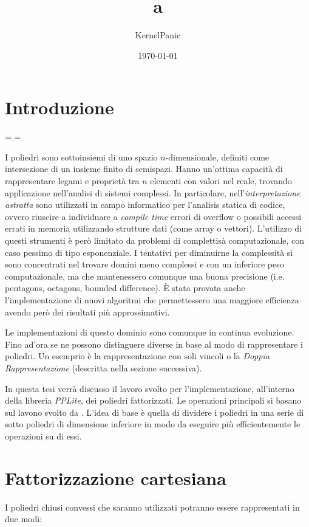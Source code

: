 \documentclass{mimosis}
\author{KernelPanic}
\date{\today}
\title{a}
\theoremstyle{definition}
\begin{document}
\maketitle
\tableofcontents


\chapter{Introduzione}
\label{sec:org8391ac6}

\newdimen\origiwspc%
  \newdimen\origiwstr%
  \origiwspc=\font%
  \origiwstr=\font%

I poliedri sono sottoinsiemi di uno spazio \(n\text{-dimensionale}\), definiti come
intersezione di un insieme finito di semispazi. Hanno un'ottima capacità di
rappresentare legami e proprietà tra \(n\) elementi con valori nel reale, trovando
applicazione nell'analisi di sistemi complessi. In particolare,
nell'\emph{interpretazione astratta} sono utilizzati in campo informatico per
l'analisis statica di codice, ovvero riuscire a individuare a \emph{compile time}
errori di overflow o possibili accessi errati in memoria utilizzando strutture
dati (come array o vettori). L'utilizzo di questi strumenti è però limitato da
problemi di complettisà computazionale, con caso pessimo di tipo esponenziale. I
tentativi per diminuirne la complessità si sono concentrati nel trovare domini
meno complessi e con un inferiore peso computazionale, ma che mantenessero
comunque una buona precisione (i.e. pentagons, octagons, bounded difference). È
stata provata anche l'implementazione di nuovi algoritmi che permettessero una
maggiore efficienza avendo però dei risultati più approssimativi.

Le implementazioni di questo dominio sono comunque in continua evoluzione. Fino
ad'ora se ne possono distinguere diverse in base al modo di rappresentare i
poliedri. Un esemprio è la rappresentazione con soli vincoli o la \emph{Doppia
Rappresentazione} (descritta nella sezione successiva).

In questa tesi verrà discusso il lavoro svolto per l'implementazione,
all'interno della libreria \emph{PPLite}, dei poliedri fattorizzati. Le operazioni
principali si basano sul lavono svolto da \cite{SinghPV17}. L'idea di base è
quella di dividere i poliedri in una serie di sotto poliedri di dimensione
inferiore in modo da eseguire più efficientemente le operazioni su di essi.
\chapter{Fattorizzazione cartesiana}
\label{sec:org34dd3ea}
I poliedri chiusi convessi che saranno utilizzati potranno essere rappresentati
in due modi:
\end{document}
